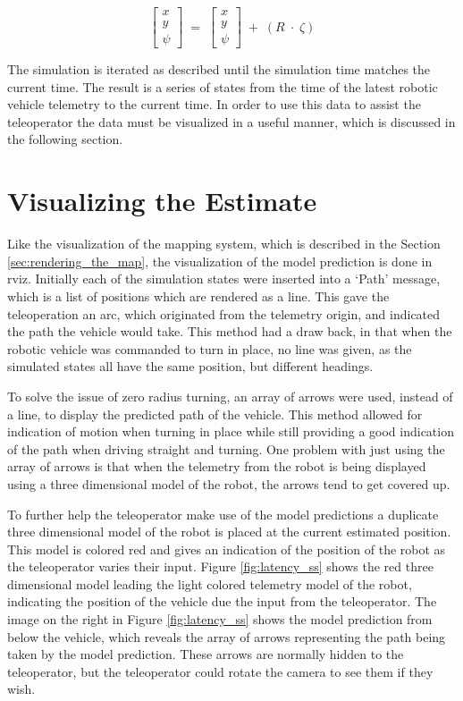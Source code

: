\documentclass[12pt]{report}
\begin{document}
\begin{equation} \label{eq:update_kinematic}
\left[ \begin{array}{c} x \\ y \\ \psi  \end{array} \right]\; =\; \left[ \begin{array}{c} x \\ y \\ \psi  \end{array} \right]\; +\; \left( R\; \cdot \; \zeta  \right)
\end{equation}

The simulation is iterated as described until the simulation time matches the current time.  The result is a series of states from the time of the latest robotic vehicle telemetry to the current time.  In order to use this data to assist the teleoperator the data must be visualized in a useful manner, which is discussed in the following section.

\section{Visualizing the Estimate}
Like the visualization of the mapping system, which is described in the Section \ref{sec:rendering_the_map}, the visualization of the model prediction is done in rviz.  Initially each of the simulation states were inserted into a `Path' message, which is a list of positions which are rendered as a line.  This gave the teleoperation an arc, which originated from the telemetry origin, and indicated the path the vehicle would take.  This method had a draw back, in that when the robotic vehicle was commanded to turn in place, no line was given, as the simulated states all have the same position, but different headings.

To solve the issue of zero radius turning, an array of arrows were used, instead of a line, to display the predicted path of the vehicle.  This method allowed for indication of motion when turning in place while still providing a good indication of the path when driving straight and turning.  One problem with just using the array of arrows is that when the telemetry from the robot is being displayed using a three dimensional model of the robot, the arrows tend to get covered up.

To further help the teleoperator make use of the model predictions a duplicate three dimensional model of the robot is placed at the current estimated position.  This model is colored red and gives an indication of the position of the robot as the teleoperator varies their input.  Figure \ref{fig:latency_ss} shows the red three dimensional model leading the light colored telemetry model of the robot, indicating the position of the vehicle due the input from the teleoperator.  The image on the right in Figure \ref{fig:latency_ss} shows the model prediction from below the vehicle, which reveals the array of arrows representing the path being taken by the model prediction.  These arrows are normally hidden to the teleoperator, but the teleoperator could rotate the camera to see them if they wish.
\end{document}
